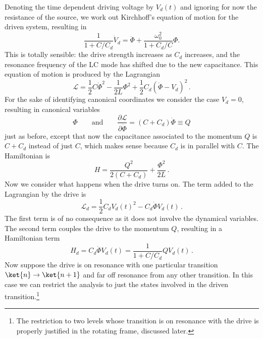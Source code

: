 Denoting the time dependent driving voltage by $V_d(t)$ and ignoring for now the resistance of the source, we work out Kirchhoff's equation of motion for the driven system, resulting in
\begin{equation}
\frac{1}{1+C/C_d} \dot{V}_d = \ddot{\Phi} + \frac{\omega_0^2}{1 + C_d/C} \Phi. \end{equation}
This is totally sensible: the drive strength increases as $C_d$ increases, and the resonance frequency of the LC mode has shifted due to the new capacitance.
This equation of motion is produced by the Lagrangian
\begin{equation}
\mathcal{L} = \frac{1}{2}C \dot{\Phi}^2 - \frac{1}{2L}\Phi^2 + \frac{1}{2} C_d \left( \dot{\Phi} - V_d \right)^2 \, .
\end{equation}
For the sake of identifying canonical coordinates we consider the case $V_d=0$, resulting in canonical variables
\begin{equation*}
  \Phi
  \qquad \textrm{and} \qquad
  \frac{\partial \mathcal{L}}{\partial \dot{\Phi}} = \left( C + C_d \right) \dot{\Phi} \equiv Q
\end{equation*}
just as before, except that now the capacitance associated to the momentum $Q$ is $C+C_d$ instead of just $C$, which makes sense because $C_d$ is in parallel with $C$.
The Hamiltonian is
\begin{equation}
  H = \frac{Q^2}{2 (C + C_d)} + \frac{\Phi^2}{2L} \, .
\end{equation}
Now we consider what happens when the drive turns on.
The term added to the Lagrangian by the drive is
\begin{equation}
  \mathcal{L}_d = \frac{1}{2}C_d V_d(t)^2 - C_d \dot{\Phi} V_d(t) \, .
\end{equation}
The first term is of no consequence as it does not involve the dynamical variables.
The second term couples the drive to the momentum $Q$, resulting in a Hamiltonian term
\begin{equation*}
H_d
  = C_d \dot{\Phi}V_d(t)
  = \frac{1}{1+C/C_d} Q V_d(t) \, . \label{eq:sec:driving:H_dVsCircuitParams}
\end{equation*}
Now suppose the drive is on resonance with one particular transition $\ket{n} \rightarrow \ket{n+1}$ and far off resonance from any other transition.
In this case we can restrict the analysis to just the states involved in the driven transition.\footnote{The restriction to two levels whose transition is on resonance with the drive is properly justified in the rotating frame, discussed later.}
